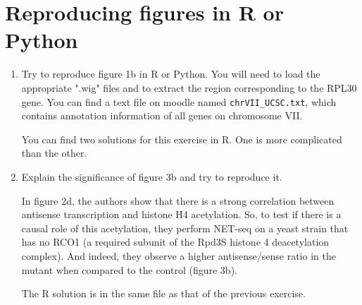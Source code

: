 \documentclass[a4paper,11pt]{article}
\begin{document}
\section{Reproducing figures in R or Python}
\begin{enumerate}
\item Try to reproduce figure 1b in R or Python. You will need to load the appropriate ".wig" files and to extract the region corresponding to the RPL30 gene. You can find a text file on moodle named \texttt{chrVII\_UCSC.txt}, which contains annotation information of all genes on chromosome VII.

You can find two solutions for this exercise in R. One is more complicated than the other.

\item Explain the significance of figure 3b and try to reproduce it.

In figure 2d, the authors show that there is a strong correlation between antisense transcription and histone H4 acetylation. So, to test if there is a causal role of this acetylation, they perform NET-seq on a yeast strain that has no RCO1 (a required subunit of the Rpd3S histone 4 deacetylation complex). And indeed, they observe a higher antisense/sense ratio in the mutant when compared to the control (figure 3b).

The R solution is in the same file as that of the previous exercise.
\end{enumerate}
\end{document}
